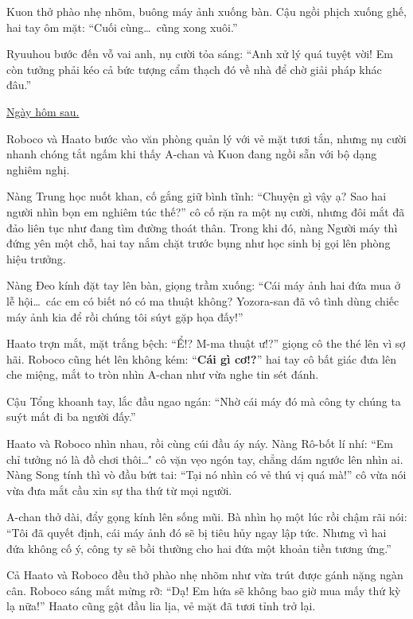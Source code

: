 \documentclass[../main.tex]{subfiles}
\begin{document}
Kuon thở phào nhẹ nhõm, buông máy ảnh xuống bàn. Cậu ngồi phịch xuống ghế, hai tay ôm mặt: ``Cuối cùng\dots\ cũng xong xuôi.''

Ryuuhou bước đến vỗ vai anh, nụ cười tỏa sáng: ``Anh xử lý quá tuyệt vời! Em còn tưởng phải kéo cả bức tượng cẩm thạch đó về nhà để chờ giải pháp khác đâu.''

\begin{center}
  \uline{Ngày hôm sau.}
\end{center}

Roboco và Haato bước vào văn phòng quản lý với vẻ mặt tươi tắn, nhưng nụ cười nhanh chóng tắt ngấm khi thấy A-chan và Kuon đang ngồi sẵn với bộ dạng nghiêm nghị.

Nàng Trung học nuốt khan, cố gắng giữ bình tĩnh: ``Chuyện gì vậy ạ? Sao hai người nhìn bọn em nghiêm túc thế?'' cô cố rặn ra một nụ cười, nhưng đôi mắt đã đảo liên tục như đang tìm đường thoát thân. Trong khi đó, nàng Người máy  thì đứng yên một chỗ, hai tay nắm chặt trước bụng như học sinh bị gọi lên phòng hiệu trưởng.

Nàng Đeo kính đặt tay lên bàn, giọng trầm xuống: ``Cái máy ảnh hai đứa mua ở lễ hội\dots\ các em có biết nó có ma thuật không? Yozora-san đã vô tình dùng chiếc máy ảnh kia để rồi chúng tôi súyt gặp họa đấy!''

Haato trợn mắt, mặt trắng bệch: ``Ể!? M-ma thuật ư!?'' giọng cô the thé lên vì sợ hãi. Roboco cũng hét lên không kém: ``\textbf{Cái gì cơ!?}'' hai tay cô bất giác đưa lên che miệng, mắt to tròn nhìn A-chan như vừa nghe tin sét đánh.

Cậu Tổng khoanh tay, lắc đầu ngao ngán: ``Nhờ cái máy đó mà công ty chúng ta suýt mất đi ba người đấy.''

Haato và Roboco nhìn nhau, rồi cùng cúi đầu áy náy. Nàng Rô-bốt lí nhí: ``Em chỉ tưởng nó là đồ chơi thôi\dots\'' cô vặn vẹo ngón tay, chẳng dám ngước lên nhìn ai. Nàng Song tính thì vò đầu bứt tai: ``Tại nó nhìn có vẻ thú vị quá mà!'' cô vừa nói vừa đưa mắt cầu xin sự tha thứ từ mọi người.

A-chan thở dài, đẩy gọng kính lên sống mũi. Bà nhìn họ một lúc rồi chậm rãi nói: ``Tôi đã quyết định, cái máy ảnh đó sẽ bị tiêu hủy ngay lập tức. Nhưng vì hai đứa không cố ý, công ty sẽ bồi thường cho hai đứa một khoản tiền tương ứng.''

Cả Haato và Roboco đều thở phào nhẹ nhõm như vừa trút được gánh nặng ngàn cân. Roboco sáng mắt mừng rỡ: ``Dạ! Em hứa sẽ không bao giờ mua mấy thứ kỳ lạ nữa!'' Haato cũng gật đầu lia lịa, vẻ mặt đã tươi tỉnh trở lại.
\end{document}
